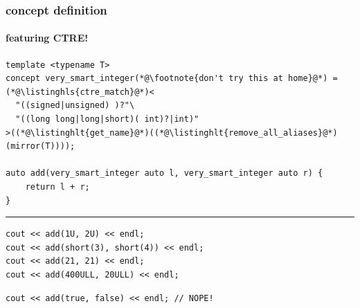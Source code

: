 \documentclass[aspectratio=169,compress,table,xcolor=table]{beamer}
\begin{document}
\begin{frame}[fragile]
  \frametitle{ concept definition}
  \framesubtitle{featuring CTRE!}
  \begin{lstlisting}[language=c++2x,basicstyle=\footnotesize\ttfamily]
template <typename T>
concept very_smart_integer(*@\footnote{don't try this at home}@*) = (*@\listinghls{ctre_match}@*)<
  "((signed|unsigned) )?"\
  "((long long|long|short)( int)?|int)"
>((*@\listinghlt{get_name}@*)((*@\listinghlt{remove_all_aliases}@*)(mirror(T))));

auto add(very_smart_integer auto l, very_smart_integer auto r) {
    return l + r;
}
  \end{lstlisting}
  \hrule
  \vfill
  \begin{lstlisting}[language=c++2x,basicstyle=\footnotesize\ttfamily]
cout << add(1U, 2U) << endl;
cout << add(short(3), short(4)) << endl;
cout << add(21, 21) << endl;
cout << add(400ULL, 20ULL) << endl;
  \end{lstlisting}
  \begin{lstlisting}[language=c++2x,basicstyle=\footnotesize\ttfamily]
cout << add(true, false) << endl; // NOPE!
  \end{lstlisting}
\end{frame}
\end{document}
